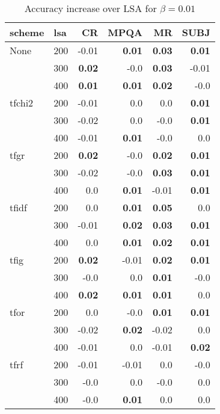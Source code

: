 \begin{table}[h]
\begin{center}

\begin{tabular}{ll|rrrr}
\toprule
scheme   &  lsa &   CR &  MPQA &   MR &  SUBJ \\
\midrule
None & 200 &     -0.01 & \textbf{0.01} & \textbf{0.03} & \textbf{0.01} \\
   & 300 & \textbf{0.02} &     -0.0 & \textbf{0.03} &     -0.01 \\
   & 400 & \textbf{0.01} & \textbf{0.01} & \textbf{0.02} &     -0.0 \\
tfchi2 & 200 &     -0.01 &      0.0 &      0.0 & \textbf{0.01} \\
   & 300 &     -0.02 &      0.0 &     -0.0 & \textbf{0.01} \\
   & 400 &     -0.01 & \textbf{0.01} &     -0.0 &      0.0 \\
tfgr & 200 & \textbf{0.02} &     -0.0 & \textbf{0.02} & \textbf{0.01} \\
   & 300 &     -0.02 &     -0.0 & \textbf{0.03} & \textbf{0.01} \\
   & 400 &      0.0 & \textbf{0.01} &     -0.01 & \textbf{0.01} \\
tfidf & 200 &      0.0 & \textbf{0.01} & \textbf{0.05} &      0.0 \\
   & 300 &     -0.01 & \textbf{0.02} & \textbf{0.03} & \textbf{0.01} \\
   & 400 &      0.0 & \textbf{0.01} & \textbf{0.02} & \textbf{0.01} \\
tfig & 200 & \textbf{0.02} &     -0.01 & \textbf{0.02} & \textbf{0.01} \\
   & 300 &     -0.0 &      0.0 & \textbf{0.01} &     -0.0 \\
   & 400 & \textbf{0.02} & \textbf{0.01} & \textbf{0.01} &      0.0 \\
tfor & 200 &      0.0 &     -0.0 & \textbf{0.01} & \textbf{0.01} \\
   & 300 &     -0.02 & \textbf{0.02} &     -0.02 &      0.0 \\
   & 400 &     -0.01 &      0.0 &     -0.01 & \textbf{0.02} \\
tfrf & 200 &     -0.01 &     -0.01 &      0.0 &     -0.0 \\
   & 300 &     -0.0 &      0.0 &     -0.0 &      0.0 \\
   & 400 &     -0.0 & \textbf{0.01} &      0.0 &      0.0 \\
\bottomrule
\end{tabular}

\caption[Accuracy increase over LSA for $\beta=0.01$]{Accuracy increase over LSA for $\beta=0.01$}
\label{tab:batch:results0.01}
\end{center}
\end{table}







